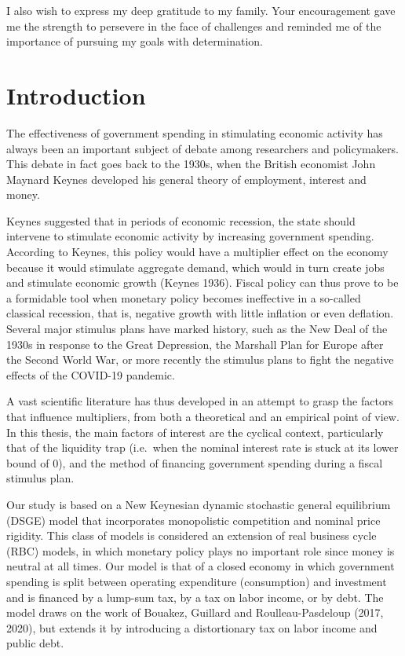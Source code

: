 \documentclass[12pt,letterpaper]{article}
\begin{document}
I also wish to express my deep gratitude to my family. Your encouragement gave me the strength to persevere in the face of challenges and reminded me of the importance of pursuing my goals with determination.

\newpage
{}

\section{Introduction}

The effectiveness of government spending in stimulating economic activity has always been an important subject of debate among researchers and policymakers. This debate in fact goes back to the 1930s, when the British economist John Maynard Keynes developed his general theory of employment, interest and money.

Keynes suggested that in periods of economic recession, the state should intervene to stimulate economic activity by increasing government spending. According to Keynes, this policy would have a multiplier effect on the economy because it would stimulate aggregate demand, which would in turn create jobs and stimulate economic growth (Keynes 1936). Fiscal policy can thus prove to be a formidable tool when monetary policy becomes ineffective in a so-called classical recession, that is, negative growth with little inflation or even deflation. Several major stimulus plans have marked history, such as the New Deal of the 1930s in response to the Great Depression, the Marshall Plan for Europe after the Second World War, or more recently the stimulus plans to fight the negative effects of the COVID-19 pandemic.

A vast scientific literature has thus developed in an attempt to grasp the factors that influence multipliers, from both a theoretical and an empirical point of view. In this thesis, the main factors of interest are the cyclical context, particularly that of the liquidity trap (i.e.\ when the nominal interest rate is stuck at its lower bound of 0), and the method of financing government spending during a fiscal stimulus plan.

Our study is based on a New Keynesian dynamic stochastic general equilibrium (DSGE) model that incorporates monopolistic competition and nominal price rigidity. This class of models is considered an extension of real business cycle (RBC) models, in which monetary policy plays no important role since money is neutral at all times. Our model is that of a closed economy in which government spending is split between operating expenditure (consumption) and investment and is financed by a lump-sum tax, by a tax on labor income, or by debt. The model draws on the work of Bouakez, Guillard and Roulleau-Pasdeloup (2017, 2020), but extends it by introducing a distortionary tax on labor income and public debt.
\end{document}
